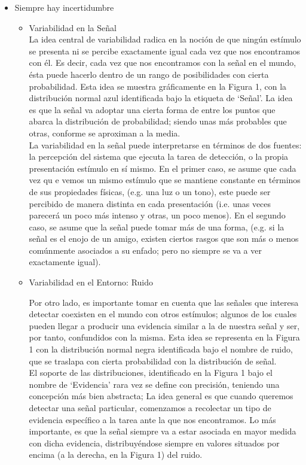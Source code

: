 \begin{itemize}
  \item{Siempre hay incertidumbre}
    \begin{itemize}
      \item{Variabilidad en la Señal}\\


La idea central de variabilidad radica en la noción de que ningún estímulo se presenta ni se percibe exactamente igual cada vez que nos encontramos con él.  Es decir, cada vez que nos encontramos con la  señal en el mundo, ésta puede hacerlo dentro de un rango de posibilidades con cierta probabilidad. Esta idea se muestra gráficamente en la Figura 1, con la distribución normal azul identificada bajo la etiqueta de ‘Señal’. La idea es que la señal va adoptar una cierta forma de entre los puntos que abarca la distribución de probabilidad; siendo unas más probables que otras, conforme se aproximan a la media.\\

La variabilidad en la señal puede interpretarse en términos de dos fuentes: la percepción del sistema que ejecuta la tarea de detección, o la propia presentación estímulo en sí mismo. En el primer caso, se asume que cada vez qu e vemos un mismo estímulo que se mantiene constante en términos de sus propiedades físicas,  (e.g. una luz o un tono),  este puede ser percibido de manera distinta en cada presentación (i.e. unas veces parecerá un poco más intenso y otras, un poco menos). En el segundo caso, se asume que la señal puede tomar más de una forma, (e.g. si la señal es el enojo de un amigo, existen ciertos rasgos que son más o menos comúnmente asociados a su enfado; pero no siempre se va a ver exactamente igual).\\

      \item{Variabilidad en el Entorno: Ruido}

Por otro lado, es importante tomar en cuenta que las señales que interesa detectar coexisten en el mundo con otros estímulos; algunos de los cuales pueden llegar a producir una evidencia similar a la de nuestra señal y ser, por tanto, confundidos con la misma. Esta idea se representa en la Figura 1 con la distribución normal negra identificada bajo el nombre de ruido, que se traslapa con cierta probabilidad con la distribución de señal.\\


El soporte de las distribuciones, identificado en la Figura 1 bajo el nombre de ‘Evidencia’ rara vez se define con precisión,  teniendo una concepción más bien abstracta; La idea general es que cuando queremos detectar una señal particular, comenzamos a recolectar un tipo de evidencia específico a la tarea ante la que nos encontramos. Lo más importante, es que la señal siempre va a estar asociada en mayor medida con dicha evidencia, distribuyéndose siempre en valores situados por encima (a la derecha, en la Figura 1) del ruido.\\



\end{itemize}
\end{itemize}
